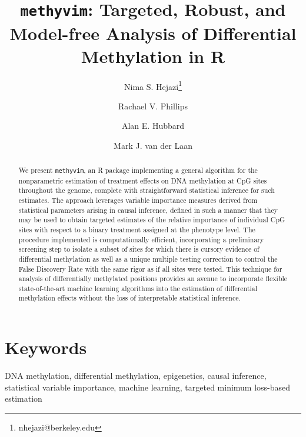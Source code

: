 \documentclass[9pt,a4paper,]{extarticle}
\theoremstyle{definition}
\theoremstyle{definition}
\theoremstyle{definition}
\theoremstyle{remark}
\begin{document}
\pagestyle{front}

\title{\texttt{methyvim}: Targeted, Robust, and Model-free Analysis of Differential Methylation in R}

\author[1,2]{Nima S. Hejazi\thanks{\ttfamily nhejazi@berkeley.edu}}
\author[1]{Rachael V. Phillips}
\author[1]{Alan E. Hubbard}
\author[1,3]{Mark J. van der Laan}

\maketitle
\thispagestyle{front}

\begin{abstract}
We present \texttt{methyvim}, an R package implementing a general algorithm for the
nonparametric estimation of treatment effects on DNA methylation at CpG sites
throughout the genome, complete with straightforward statistical inference for
such estimates. The approach leverages variable importance measures derived
from statistical parameters arising in causal inference, defined in such a
manner that they may be used to obtain targeted estimates of the relative
importance of individual CpG sites with respect to a binary treatment assigned
at the phenotype level. The procedure implemented is computationally
efficient, incorporating a preliminary screening step to isolate a subset of
sites for which there is cursory evidence of differential methylation as well
as a unique multiple testing correction to control the False Discovery Rate
with the same rigor as if all sites were tested. This technique for analysis
of differentially methylated positions provides an avenue to incorporate
flexible state-of-the-art machine learning algorithms into the estimation of
differential methylation effects without the loss of interpretable statistical
inference.
\end{abstract}

\section*{Keywords}
DNA methylation, differential methylation, epigenetics, causal inference, statistical variable importance, machine learning, targeted minimum loss-based estimation


\clearpage
\pagestyle{main}
\end{document}
